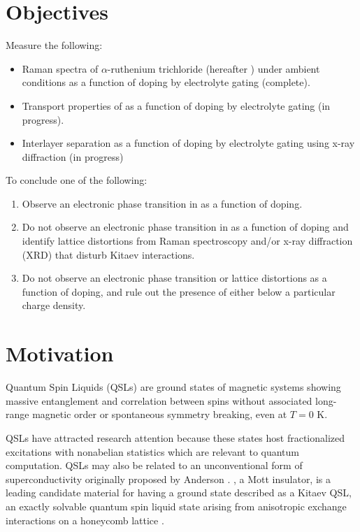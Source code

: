 \documentclass[11pt]{article}
\begin{document}
\section{Objectives}
Measure the following:
\begin{itemize}
	\item Raman spectra of $\alpha$-ruthenium trichloride (hereafter \ruclnospace) under ambient conditions as a function of doping by electrolyte gating (complete).
	\item Transport properties of \rucl as a function of doping by electrolyte gating (in progress).
	\item Interlayer separation as a function of doping by electrolyte gating using x-ray diffraction (in progress)
\end{itemize}
To conclude one of the following:
\begin{enumerate}
	\item Observe an electronic phase transition in \rucl as a function of doping.
	\item Do not observe an electronic phase transition in \rucl as a function of doping and identify lattice distortions from Raman spectroscopy and/or x-ray diffraction (XRD) that disturb Kitaev interactions.
	\item Do not observe an electronic phase transition or lattice distortions as a function of doping, and rule out the presence of either below a particular charge density.
\end{enumerate}

\section{Motivation}
Quantum Spin Liquids (QSLs) are ground states of magnetic systems showing massive entanglement and correlation between spins without associated long-range magnetic order or spontaneous symmetry breaking, even at $T = 0$ K. 

QSLs have attracted research attention because these states host fractionalized excitations with nonabelian statistics \cite{Balents2010} which are relevant to quantum computation. QSLs may also be related to an unconventional form of superconductivity originally proposed by Anderson \cite{Lee2008}. \ruclnospace , a Mott insulator, is a leading candidate material for having a ground state described as a Kitaev QSL, an exactly solvable quantum spin liquid state arising from anisotropic exchange interactions on a honeycomb lattice \cite{Kitaev2006}.
\end{document}
